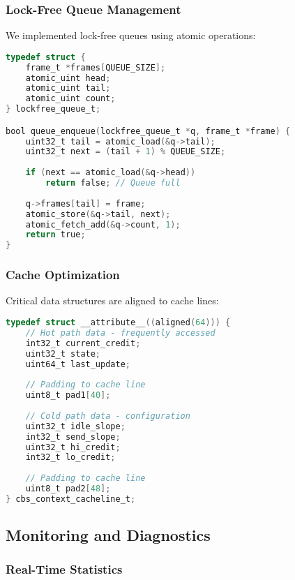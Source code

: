 \documentclass[10pt, journal, compsoc]{IEEEtran}
\begin{document}
\subsubsection{Lock-Free Queue Management}

We implemented lock-free queues using atomic operations:

\begin{lstlisting}[language=C, caption=Lock-Free Queue Operations]
typedef struct {
    frame_t *frames[QUEUE_SIZE];
    atomic_uint head;
    atomic_uint tail;
    atomic_uint count;
} lockfree_queue_t;

bool queue_enqueue(lockfree_queue_t *q, frame_t *frame) {
    uint32_t tail = atomic_load(&q->tail);
    uint32_t next = (tail + 1) % QUEUE_SIZE;
    
    if (next == atomic_load(&q->head))
        return false; // Queue full
    
    q->frames[tail] = frame;
    atomic_store(&q->tail, next);
    atomic_fetch_add(&q->count, 1);
    return true;
}
\end{lstlisting}

\subsubsection{Cache Optimization}

Critical data structures are aligned to cache lines:

\begin{lstlisting}[language=C, caption=Cache-Aligned Structures]
typedef struct __attribute__((aligned(64))) {
    // Hot path data - frequently accessed
    int32_t current_credit;
    uint32_t state;
    uint64_t last_update;
    
    // Padding to cache line
    uint8_t pad1[40];
    
    // Cold path data - configuration
    uint32_t idle_slope;
    int32_t send_slope;
    uint32_t hi_credit;
    int32_t lo_credit;
    
    // Padding to cache line
    uint8_t pad2[48];
} cbs_context_cacheline_t;
\end{lstlisting}

\subsection{Monitoring and Diagnostics}

\subsubsection{Real-Time Statistics}
\end{document}
